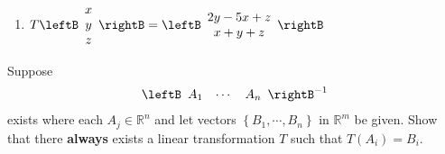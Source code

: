 \begin{enumialphparenastyle}
\begin{ex}
\begin{enumerate}
\item $T\leftB
\begin{array}{c}
x \\
y \\
z
\end{array}
\rightB =\leftB
\begin{array}{c}
2y-5x+z \\
x+y+z
\end{array}
\rightB $
\end{enumerate}
\end{ex}


\begin{ex} Suppose 
\begin{equation*}
\leftB
\begin{array}{ccc}
A_{1} & \cdots & A_{n}
\end{array}
\rightB ^{-1}
\end{equation*}
 exists where each $A_{j}\in \mathbb{R}^{n}$ and let
vectors  $\left\{ B_{1},\cdots ,B_{n}\right\} $ in $\mathbb{R}^{m}$ be given. 
Show that there \textbf{always }exists a linear
transformation $T$ such that $T(A_{i})=B_{i}$.
\end{ex}

\end{enumialphparenastyle}